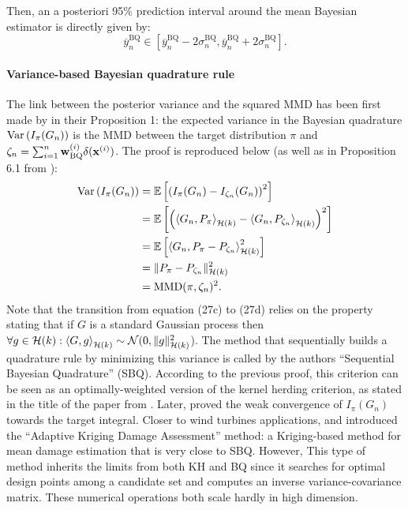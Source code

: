 \noindent Then, an a posteriori 95\% prediction interval around the mean Bayesian estimator is directly given by: 
\begin{equation}
   \overline{y}_n^{\mathrm{BQ}} \in \left[\overline{y}_n^{\mathrm{BQ}} - 2\sigma_n^{\mathrm{BQ}}, \overline{y}_n^{\mathrm{BQ}} + 2\sigma_n^{\mathrm{BQ}} \right].
\end{equation}

\paragraph{Variance-based Bayesian quadrature rule}%
The link between the posterior variance and the squared MMD has been first made by \cite{husar_duvenaud_2012} in their Proposition 1: the expected variance in the Bayesian quadrature $\operatorname{Var}\left(I_{\pi}(G_n)\right)$ is the MMD between the target distribution $\pi$ and $\zeta_n = \sum_{i=1}^n \mathbf{w}_{\mathrm{BQ}}^{(i)} \delta({\bf x}^{(i)})$. 
The proof is reproduced below (as well as in Proposition 6.1 from \cite{motonobu_2018}): 
\begin{subequations}
\begin{align}
    \operatorname{Var}\left(I_{\pi}(G_n)\right) &= \mathbb{E}\left[ \left(I_{\pi}(G_n) - I_{\zeta_n}(G_n)\right)^2\right]\\
    &= \mathbb{E}\left[ \left( \left\langle G_n, P_{\pi} \right\rangle_{\mathcal{H}(k)} - \left\langle G_n, P_{\zeta_n}\right\rangle_{\mathcal{H}(k)} \right)^2\right]\\
    &= \mathbb{E}\left[ \left\langle G_n, P_{\pi} - P_{\zeta_n} \right\rangle_{\mathcal{H}(k)}^2\right]\\
    &= \lVert P_{\pi} - P_{\zeta_n} \lVert^2_{\mathcal{H}(k)}\\ 
    &= \mathrm{MMD}(\pi, \zeta_n)^2.
\end{align}
\end{subequations}
Note that the transition from equation (27c) to (27d) relies on the property stating that if $G$ is a standard Gaussian process then $\forall g \in \mathcal{H}(k) : \left\langle G, g \right\rangle_{\mathcal{H}(k)} \sim \mathcal{N}(0, \lVert g \lVert^2_{\mathcal{H}(k)}$). 
The method that sequentially builds a quadrature rule by minimizing this variance is called by the authors ``Sequential Bayesian Quadrature'' (SBQ). 
According to the previous proof, this criterion can be seen as an optimally-weighted version of the kernel herding criterion, as stated in the title of the paper from \cite{husar_duvenaud_2012}. 
Later, \cite{briol_2015} proved the weak convergence of $I_{\pi}(G_n)$ towards the target integral. 
Closer to wind turbines applications, \cite{huchet_2019} and \cite{huchet_mattrand_2019} introduced the ``Adaptive Kriging Damage Assessment'' method: a Kriging-based method for mean damage estimation that is very close to SBQ. 
However, This type of method inherits the limits from both KH and BQ since it searches for optimal design points among a candidate set and computes an inverse variance-covariance matrix. 
These numerical operations both scale hardly in high dimension. 

